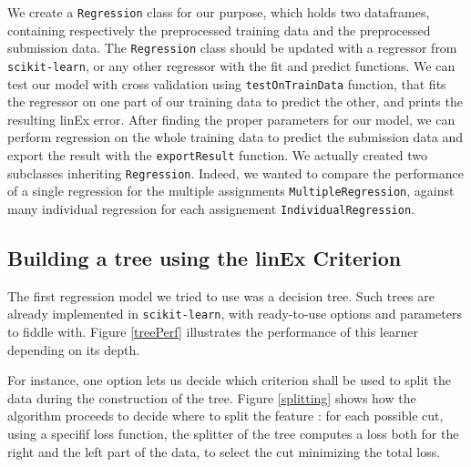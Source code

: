 \documentclass[a4paper,10pt]{article}
\begin{document}
  We create a {\tt Regression} class for our purpose, which holds two dataframes, containing respectively the preprocessed training data and the preprocessed submission data. The {\tt Regression} class should be updated with a regressor from {\tt scikit-learn}, or any other regressor with the fit and predict functions. We can test our model with cross validation using {\tt testOnTrainData} function, that fits the regressor on one part of our training data to predict the other, and prints the resulting linEx error. After finding the proper parameters for our model, we can perform regression on the whole training data to predict the submission data and export the result with the {\tt exportResult} function. We actually created two subclasses inheriting {\tt Regression}. Indeed, we wanted to compare the performance of a single regression for the multiple assignments {\tt MultipleRegression}, against many individual regression for each assignement {\tt IndividualRegression}.

  \subsection{Building a tree using the linEx Criterion}

  The first regression model we tried to use was a decision tree. Such trees are already implemented in {\tt scikit-learn}, with ready-to-use options and parameters to fiddle with. Figure \ref{treePerf} illustrates the performance of this learner depending on its depth.

  For instance, one option lets us decide which criterion shall be used to split the data during the construction of the tree. Figure \ref{splitting} shows how the algorithm proceeds to decide where to split the feature : for each possible cut, using a specifif loss function, the splitter of the tree computes a loss both for the right and the left part of the data, to select the cut minimizing the total loss.
\end{document}
